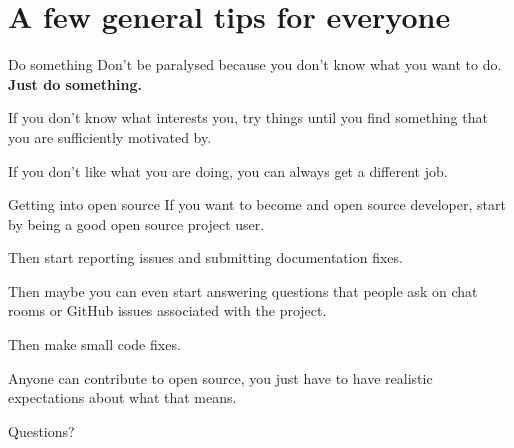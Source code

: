 \documentclass{acm}
\begin{document}
\section{A few general tips for everyone}

\begin{frame}{Do something}
    Don't be paralysed because you don't know what you want to do. \textbf{Just
    do something.}

    If you don't know what interests you, try things until you find something
    that you are sufficiently motivated by.

    If you don't like what you are doing, you can always get a different job.
\end{frame}

\begin{frame}{Getting into open source}
    If you want to become and open source developer, start by being a good open
    source project user.
    \pause

    Then start reporting issues and submitting documentation fixes.
    \pause

    Then maybe you can even start answering questions that people ask on chat
    rooms or GitHub issues associated with the project.
    \pause

    Then make small code fixes.
    \pause

    Anyone can contribute to open source, you just have to have realistic
    expectations about what that means.
\end{frame}

\begin{frame}[standout]
    \Huge
    Questions?
\end{frame}
\end{document}
